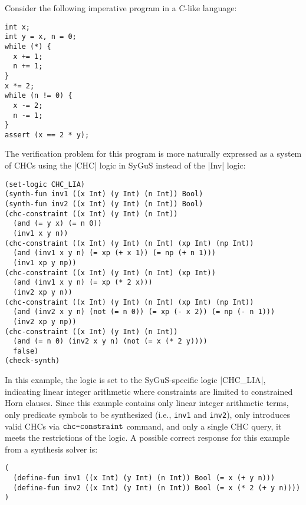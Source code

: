 \documentclass[english,a4paper,10pt]{article}
\begin{document}
\begin{example}
Consider the following imperative program in a C-like language:
\begin{lstlisting}[language=C-Like]
int x;
int y = x, n = 0;
while (*) {
  x += 1;
  n += 1;
}
x *= 2;
while (n != 0) {
  x -= 2;
  n -= 1;
}
assert (x == 2 * y);
\end{lstlisting}
The verification problem for this program is more naturally expressed as a system of CHCs
using the \code|CHC| logic in SyGuS instead of the \code|Inv| logic:
\begin{lstlisting}[language=SyGuS]
(set-logic CHC_LIA)
(synth-fun inv1 ((x Int) (y Int) (n Int)) Bool)
(synth-fun inv2 ((x Int) (y Int) (n Int)) Bool)
(chc-constraint ((x Int) (y Int) (n Int))
  (and (= y x) (= n 0))
  (inv1 x y n))
(chc-constraint ((x Int) (y Int) (n Int) (xp Int) (np Int))
  (and (inv1 x y n) (= xp (+ x 1)) (= np (+ n 1)))
  (inv1 xp y np))
(chc-constraint ((x Int) (y Int) (n Int) (xp Int))
  (and (inv1 x y n) (= xp (* 2 x)))
  (inv2 xp y n))
(chc-constraint ((x Int) (y Int) (n Int) (xp Int) (np Int))
  (and (inv2 x y n) (not (= n 0)) (= xp (- x 2)) (= np (- n 1)))
  (inv2 xp y np))
(chc-constraint ((x Int) (y Int) (n Int))
  (and (= n 0) (inv2 x y n) (not (= x (* 2 y))))
  false)
(check-synth)
\end{lstlisting}
In this example, the logic is set to the SyGuS-specific logic
\code|CHC_LIA|, indicating linear integer arithmetic
where constraints are limited to constrained Horn clauses.
Since this example contains only linear integer arithmetic terms,
only predicate symbols to be synthesized (i.e., \texttt{inv1} and \texttt{inv2}),
only introduces valid CHCs via $\texttt{chc-constraint}$ command, and
only a single CHC query,
it meets the restrictions of the logic.
A possible correct response for this example from a synthesis solver is:
\begin{lstlisting}[language=SyGuS]
(
  (define-fun inv1 ((x Int) (y Int) (n Int)) Bool (= x (+ y n)))
  (define-fun inv2 ((x Int) (y Int) (n Int)) Bool (= x (* 2 (+ y n))))
)
\end{lstlisting}
\end{example}



\end{document}
